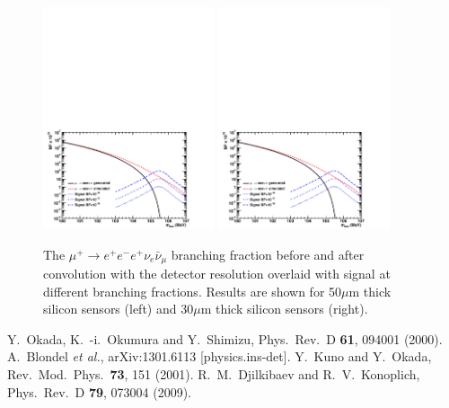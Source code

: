 \begin{figure}[htb]
\begin{center}
\includegraphics[width=0.45\textwidth]{Figures/mu3e-irr.pdf}
\includegraphics[width=0.45\textwidth]{Figures/mu3e-irr.pdf}
\end{center}
\caption{The $\mu^+ \rightarrow e^+e^-e^+\nu_e \bar\nu_\mu$ branching fraction before and after convolution with the detector resolution overlaid with signal at different branching 
fractions. Results are shown for 50$\mu$m thick silicon sensors (left) and 30$\mu$m thick silicon sensors (right).}
\label{Fig::mu3e2}
\end{figure}


\begin{thebibliography}{99}

   Y.~Okada, K.~-i.~Okumura and Y.~Shimizu, Phys.\ Rev.\ D {\bf 61}, 094001 (2000).
 A.~Blondel {\it et al.}, arXiv:1301.6113 [physics.ins-det].
 Y.~Kuno and Y.~Okada, Rev.\ Mod.\ Phys.\  {\bf 73}, 151 (2001).
 R.~M.~Djilkibaev and R.~V.~Konoplich, Phys.\ Rev.\ D {\bf 79}, 073004 (2009).
\end{thebibliography}

